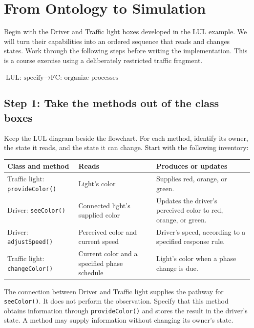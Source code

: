 \documentclass[11pt,a4paper]{article}
\newenvironment{fitdisplay}{\par\medskip\noindent\begin{lrbox}{\displaybox}$\displaystyle}{%
$\end{lrbox}\makebox[\linewidth][c]{\ifdim\wd\displaybox>\linewidth\resizebox{\linewidth}{!}{\usebox{\displaybox}}\else\usebox{\displaybox}\fi}\par\medskip}
\begin{document}
\clearpage
\section{From Ontology to Simulation}

Begin with the Driver and Traffic light boxes developed in the LUL example. We will turn their capabilities into an ordered sequence that reads and changes states. Work through the following steps before writing the implementation. This is a course exercise using a deliberately restricted traffic fragment.

\begin{fitdisplay}
\boxed{\text{LUL: specify}\rightarrow\text{FC: organize processes}}
\end{fitdisplay}

\subsection{Step 1: Take the methods out of the class boxes}

Keep the LUL diagram beside the flowchart. For each method, identify its owner, the state it reads, and the state it can change. Start with the following inventory:

\begin{center}
\renewcommand{\arraystretch}{1.2}
\begin{tabularx}{\linewidth}{@{}P{3.5cm}YY@{}}
\toprule
\textbf{Class and method} & \textbf{Reads} & \textbf{Produces or updates}\\
\midrule
Traffic light: \texttt{provideColor()} & Light's color & Supplies red, orange, or green.\\
Driver: \texttt{seeColor()} & Connected light's supplied color & Updates the driver's perceived color to red, orange, or green.\\
Driver: \texttt{adjustSpeed()} & Perceived color and current speed & Driver's speed, according to a specified response rule.\\
Traffic light: \texttt{changeColor()} & Current color and a specified phase schedule & Light's color when a phase change is due.\\
\bottomrule
\end{tabularx}
\end{center}

The connection between Driver and Traffic light supplies the pathway for \texttt{seeColor()}. It does not perform the observation. Specify that this method obtains information through \texttt{provideColor()} and stores the result in the driver's state. A method may supply information without changing its owner's state.
\end{document}
